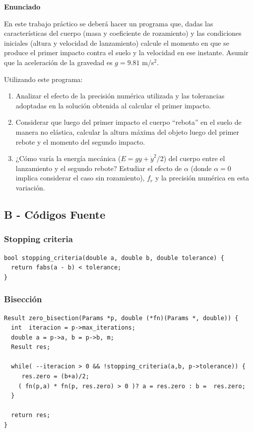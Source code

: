 \documentclass[a4paper]{article}
\begin{document}
{\bf Enunciado}

En este trabajo práctico se deberá hacer un programa que, dadas las características del cuerpo (masa y coeficiente de rozamiento) y las condiciones iniciales (altura y velocidad de lanzamiento) calcule el momento en que se produce el primer impacto contra el suelo y la velocidad en ese instante. Asumir que la aceleración de la gravedad es $g = 9.81$ m/s$^2$.

Utilizando este programa:
\begin{enumerate}
  \item Analizar el efecto de la precisión numérica utilizada y las tolerancias adoptadas en la solución obtenida al calcular el primer impacto.
  
  \item Considerar que luego del primer impacto el cuerpo ``rebota'' en el suelo de manera no elástica, calcular la altura máxima del objeto luego del primer rebote y el momento del segundo impacto.

  \item ¿Cómo varía la energía mecánica ($E = g y +\dot{y}^2/2$) del cuerpo entre el lanzamiento y el segundo rebote? Estudiar el efecto de $\alpha$ (donde $\alpha = 0$ implica considerar el caso sin rozamiento), $f_r$ y la precisión numérica en esta variación.
\end{enumerate}

\newpage

\subsection{B - Códigos Fuente}

\subsubsection{Stopping criteria}
\begin{verbatim}
bool stopping_criteria(double a, double b, double tolerance) {
  return fabs(a - b) < tolerance;
}
\end{verbatim}

\subsubsection{Bisección}
\begin{verbatim}
Result zero_bisection(Params *p, double (*fn)(Params *, double)) {
  int  iteracion = p->max_iterations;
  double a = p->a, b = p->b, m;
  Result res;

  while( --iteracion > 0 && !stopping_criteria(a,b, p->tolerance)) {
     res.zero = (b+a)/2;
    ( fn(p,a) * fn(p, res.zero) > 0 )? a = res.zero : b =  res.zero;
  }

  return res;
}
\end{verbatim}
\end{document}
